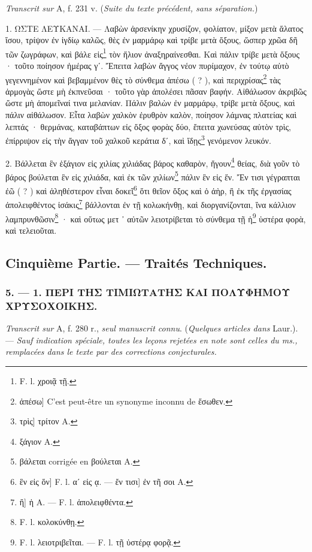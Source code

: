 \documentclass[a4paper, 11pt, oneside, polutonikogreek, french]{article}
\begin{document}
\emph{Transcrit sur} A, f. 231 v. (\emph{Suite du texte précédent, sans séparation.})

1. ΩΣΤΕ ΛΕΥΚΑΝΑΙ. --- Λαβὼν ἀρσενίκην χρυσίζον, φολίατον, μίξον μετὰ ἅλατος ἴσου, τρίψον ἐν ἰγδίῳ καλῶς, θὲς ἐν μαρμάρῳ καὶ τρίβε μετὰ ὄξους, ὥσπερ χρῶα δῆ τῶν ζωγράφων, καὶ βάλε εἰς\footnote{F. l. χροιᾷ τῇ.} τὸν ἥλιον ἀναξηραίνεσθαι. Καὶ πάλιν τρίβε μετὰ ὄξους · τοῦτο ποίησον ἡμέρας γʹ. Ἔπειτα λαβὼν ἄγγος νέον πυρίμαχον, ἐν τούτῳ αὐτὸ γεγεννημένον καὶ βεβαμμένον θὲς τὸ σύνθεμα ἀπέσω ( ? ), καὶ περιχρίσας\footnote{ἀπέσω] C'est peut-être un synonyme inconnu de ἔσωθεν.} τὰς ἁρμογὰς ὥστε μὴ ἐκπνεῦσαι · τοῦτο γὰρ ἀπολέσει πᾶσαν βαφήν. Αἰθάλωσον ἀκριβῶς ὥστε μὴ ἀπομεῖναί τινα μελανίαν. Πάλιν βαλὼν ἐν μαρμάρῳ, τρίβε μετὰ ὄξους, καὶ πάλιν αἰθάλωσον. Εἶτα λαβὼν χαλκὸν ἐρυθρὸν καλὸν, ποίησον λάμνας πλατείας καὶ λεπτάς · θερμάνας, καταβάπτων εἰς ὄξος φορὰς δύο, ἔπειτα χωνεύσας αὐτὸν τρὶς, ἐπίρριψον εἰς τὴν ἄγγαν τοῦ χαλκοῦ κεράτια δʹ, καὶ ἴδῃς\footnote{τρὶς] τρίτον A.} γενόμενον λευκόν.

2. Βάλλεται ἓν ἑξάγιον εἰς χιλίας χιλιάδας βάρος καθαρὸν, ἤγουν\footnote{ξάγιον A.} θείας, διὰ γοῦν τὸ βάρος βούλεται ἓν εἰς χιλιάδα, καὶ ἐκ τῶν χιλίων\footnote{βάλεται corrigée en βούλεται A.} πάλιν ἓν εἰς ἕν. Ἔν τισι γέγραπται ἐῶ ( ? ) καὶ ἀληθέστερον εἶναι δοκεῖ\footnote{ἓν εἰς ὅν] F. l. αʹ εἰς ᾳ. --- ἔν τισι] ἐν τῆ σοι A.} ὅτι θεῖον ὄξος καὶ ὁ ἀὴρ, ἢ ἐκ τῆς ἐργασίας ἀπολειφθέντος ἰσάκις\footnote{ἢ] ἡ A. --- F. l. ἀπολειφθέντα.} βάλλονται ἐν τῇ κολωκήνθῃ, καὶ διοργανίζονται, ἵνα κάλλιον λαμπρυνθῶσιν\footnote{F. l. κολοκύνθῃ.} · καὶ οὕτως μετ ᾽ αὐτῶν λειοτρίβεται τὸ σύνθεμα τῇ ἡ\footnote{F. l. λειοτριβεῖται. --- F. l. τῇ ὑστέρᾳ φορᾷ.} ὑστέρα φορὰ, καὶ τελειοῦται.

\bigskip
\centerline{\EightStarTaper}
\centerline{\EightStarTaper\EightStarTaper}
\bigskip

\subsection{Cinquième Partie. --- Traités Techniques.}
\subsubsection{5. --- 1. ΠΕΡΙ ΤΗΣ ΤΙΜΙΩΤΑΤΗΣ ΚΑΙ ΠΟΛΥΦΗΜΟΥ ΧΡΥΣΟΧΟΙΚΗΣ.}

\emph{Transcrit sur} A, f. 280 r., \emph{seul manuscrit connu}. (\emph{Quelques articles dans} Laur.). --- \emph{Sauf indication spéciale, toutes les leçons rejetées en note sont celles du ms., remplacées dans le texte par des corrections conjecturales.}
\end{document}
